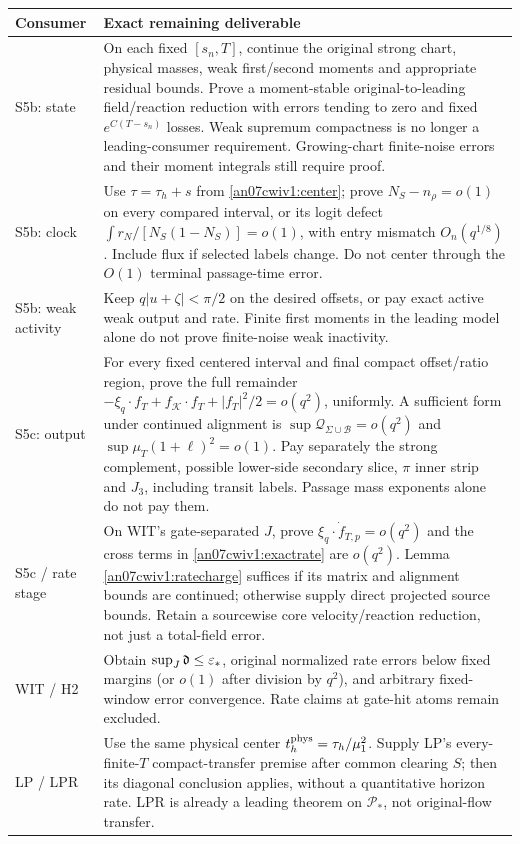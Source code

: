 \documentclass[11pt]{article}
\numberwithin{equation}{section}
\theoremstyle{remark}\newtheorem{remark}[theorem]{Remark}
\newcommand{\KK}{\mathcal K}\newcommand{\BB}{\mathcal B}
\newcommand{\dist}{\mathfrak d}
\begin{document}
\small
\begin{longtable}{>{\raggedright\arraybackslash}p{}>{\raggedright\arraybackslash}p{}}
\toprule Consumer & Exact remaining deliverable\\\midrule
\endhead
S5b: state & On each fixed \([s_n,T]\), continue the original
 strong chart, physical masses, weak first/second moments and
 appropriate residual bounds. Prove a moment-stable
 original-to-leading field/reaction reduction with errors
 tending to zero and fixed \(e^{C(T-s_n)}\) losses.
 Weak supremum compactness is no longer a leading-consumer
 requirement. Growing-chart finite-noise errors and their
 moment integrals still require proof.\\
S5b: clock & Use \(\tau=\tau_h+s\) from
 \eqref{an07cwiv1:center}; prove \(N_S-n_\rho=o(1)\) on every
 compared interval, or its logit defect
 \(\int r_N/[N_S(1-N_S)]=o(1)\), with entry mismatch
 \(O_n(q^{1/8})\). Include flux if selected labels change.
 Do not center through the \(O(1)\) terminal passage-time error.\\
S5b: weak activity & Keep \(q|u+\zeta|<\pi/2\) on the desired
 offsets, or pay exact active weak output and rate.
 Finite first moments in the leading model alone do not
 prove finite-noise weak inactivity.\\
S5c: output & For every fixed centered interval and final
 compact offset/ratio region, prove the full remainder
 \(-\xi_q\cdot f_T+f_\KK\cdot f_T+|f_T|^2/2=o(q^2)\),
 uniformly. A sufficient form under continued alignment is
 \(\sup\mathcal Q_{\Sigma\cup\BB}=o(q^2)\) and
 \(\sup\mu_T(1+\ell)^2=o(1)\).
 Pay separately the strong complement, possible lower-side
 secondary slice, \(\pi\) inner strip and \(J_3\), including
 transit labels. Passage mass exponents alone do not pay them.\\
S5c / rate stage & On WIT's gate-separated \(J\), prove
 \(\xi_q\cdot\dot f_{T,p}=o(q^2)\) and the cross terms in
 \eqref{an07cwiv1:exactrate} are \(o(q^2)\).
 Lemma \ref{an07cwiv1:ratecharge} suffices if its matrix and
 alignment bounds are continued; otherwise supply direct
 projected source bounds. Retain a sourcewise core
 velocity/reaction reduction, not just a total-field error.\\
WIT / H2 & Obtain \(\sup_J\dist\le\eps_*\), original normalized
 rate errors below fixed margins (or \(o(1)\) after division
 by \(q^2\)), and arbitrary fixed-window error convergence.
 Rate claims at gate-hit atoms remain excluded.\\
LP / LPR & Use the same physical center
 \(t_h^{\rm phys}=\tau_h/\mu_1^2\). Supply LP's every-finite-\(T\)
 compact-transfer premise after common clearing \(S\);
 then its diagonal conclusion applies, without a quantitative
 horizon rate. LPR is already a leading theorem on
 \(\mathcal P_*\), not original-flow transfer.\\\bottomrule
\end{longtable}\normalsize
\end{document}
